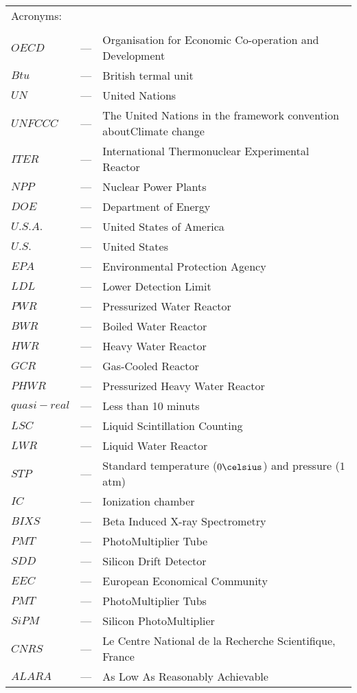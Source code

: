 \begin{longtable}{p{25mm} c p{120mm} }
\multicolumn{3}{l}{Acronyms:}\\
\\
$OECD$ & --- & Organisation for Economic Co-operation and Development\\
$Btu$ & --- & British termal unit\\
$UN$ & --- & United Nations\\
$UNFCCC$ & --- & The United Nations in the framework convention about\newline Climate change\\
$ITER$ & --- & International Thermonuclear Experimental Reactor\\
$NPP$ & --- & Nuclear Power Plants\\
$DOE$ & --- & Department of Energy\\
$U.S.A.$ & --- & United States of America\\
$U.S.$ & --- & United States\\
$EPA$ & --- & Environmental Protection Agency\\
$LDL$ & --- & Lower Detection Limit\\
$PWR$ & --- & Pressurized Water Reactor\\
$BWR$ & --- & Boiled Water Reactor\\
$HWR$ & --- & Heavy Water Reactor\\
$GCR$ & --- & Gas-Cooled Reactor\\
$PHWR$ & --- & Pressurized Heavy Water Reactor\\
$quasi-real$ & --- & Less than 10 minuts\\
$LSC$ & --- & Liquid Scintillation Counting\\
$LWR$ & --- & Liquid Water Reactor\\
$STP$ & --- & Standard temperature ($0\celsius$) and pressure ($1$ atm)\\
$IC$ & --- & Ionization chamber\\
$BIXS$ & --- & Beta Induced X-ray Spectrometry\\
$PMT$ & --- & PhotoMultiplier Tube\\
$SDD$ & --- & Silicon Drift Detector\\
$EEC$ & --- & European Economical Community\\
$PMT$ & --- & PhotoMultiplier Tubs\\
$SiPM$ & --- & Silicon PhotoMultiplier\\
$CNRS$ & --- & Le Centre National de la Recherche Scientifique, France\\
$ALARA$ & --- & As Low As Reasonably Achievable\\


\end{longtable}
